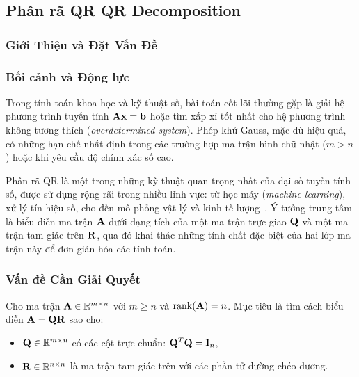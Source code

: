 \subsection{Phân rã QR \- QR Decomposition}
\subsubsection{Giới Thiệu và Đặt Vấn Đề}

\subsubsection{Bối cảnh và Động lực}

Trong tính toán khoa học và kỹ thuật số, bài toán cốt lõi thường gặp là giải hệ
phương trình tuyến tính $\mathbf{A}\mathbf{x} = \mathbf{b}$ hoặc tìm xấp xỉ tốt nhất cho
hệ phương trình không tương thích (\textit{overdetermined system}). Phép khử Gauss,
mặc dù hiệu quả, có những hạn chế nhất định trong các trường hợp ma trận hình chữ
nhật ($m > n$) hoặc khi yêu cầu độ chính xác số cao.

Phân rã QR là một trong những kỹ thuật quan trọng nhất của đại số tuyến tính số,
được sử dụng rộng rãi trong nhiều lĩnh vực: từ học máy (\textit{machine learning}),
xử lý tín hiệu số, cho đến mô phỏng vật lý và kinh tế lượng~\cite{golub2013}. Ý tưởng trung tâm là
biểu diễn ma trận $\mathbf{A}$ dưới dạng tích của một ma trận trực giao $\mathbf{Q}$ và
một ma trận tam giác trên $\mathbf{R}$, qua đó khai thác những tính chất đặc biệt của
hai lớp ma trận này để đơn giản hóa các tính toán.

\subsubsection{Vấn đề Cần Giải Quyết}

\begin{tcolorbox}[enhanced, colback=blue!8!white, colframe=primaryblue,
    title=\textbf{Bài toán tổng quát}, fonttitle=\bfseries]
Cho ma trận $\mathbf{A} \in \mathbb{R}^{m \times n}$ với $m \geq n$ và $\operatorname{rank}(\mathbf{A}) = n$.
Mục tiêu là tìm cách biểu diễn $\mathbf{A} = \mathbf{Q}\mathbf{R}$ sao cho:
\begin{itemize}[noitemsep]
    \item $\mathbf{Q} \in \mathbb{R}^{m \times n}$ có các cột trực chuẩn: $\mathbf{Q}^T\mathbf{Q} = \mathbf{I}_n$,
    \item $\mathbf{R} \in \mathbb{R}^{n \times n}$ là ma trận tam giác trên với các phần tử đường
          chéo dương.
\end{itemize}
\end{tcolorbox}

